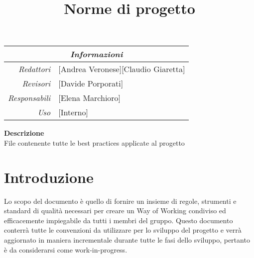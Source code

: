 \documentclass[12pt]{article}
\begin{document}
\graphicspath{ {../templates/img/} }
\setcounter{tocdepth}{4}
\setcounter{secnumdepth}{4}
\title{Norme di progetto}

\firstPage

\maketitle

\begin{center}
    \begin{tabular}{r | l}
		\multicolumn{2}{c}{\textit{Informazioni}}\\
		\hline
		
			\textit{Redattori} &
			[Andrea Veronese][Claudio Giaretta]\makecell{}\\

			\textit{Revisori} &
			[Davide Porporati]\makecell{}\\
			\textit{Responsabili} &
			[Elena Marchioro]\makecell{}\\
		      \textit{Uso} & 
                [Interno]\makecell{}\\
    \end{tabular}
\end{center}

\begin{center}
    \textbf{Descrizione}\\
    File contenente tutte le best practices applicate al progetto 
\end{center}

\pagebreak

\tableofcontents

\pagebreak

\printindex 

\makeversioni
\section{Introduzione}
Lo scopo del documento è quello di fornire un insieme di regole, strumenti e standard di qualità necessari per creare un Way of Working condiviso ed efficacemente impiegabile da tutti i membri del gruppo.
Questo documento conterrà tutte le convenzioni da utilizzare per lo sviluppo del progetto e verrà aggiornato in maniera incrementale durante tutte le fasi dello sviluppo, pertanto è da considerarsi come work-in-progress.
\end{document}
